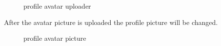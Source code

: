 \begin{figure}[!h]
  \centering
  \caption{profile avatar uploader}
  \label{fig:profil_editieren_uploader}
\end{figure}

\pagebreak

After the avatar picture is uploaded the profile picture will be changed.

\begin{figure}[!h]
  \centering
  \caption{profile avatar picture}
  \label{fig:profil_editieren_avatar}
\end{figure}



